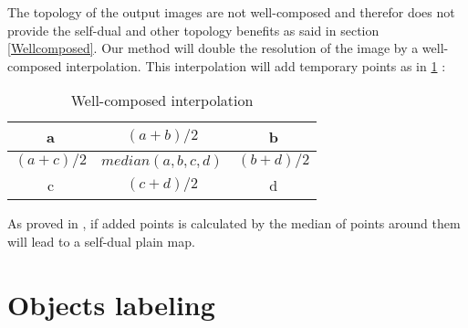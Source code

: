 \par The topology of the output images are not well-composed and therefor does not provide the self-dual and other topology benefits as said in section \ref{Wellcomposed}. Our method will double the resolution of the image by a well-composed interpolation. This interpolation will add temporary points as in \ref{WllCmpInterpolation} :
\par
\begin{table}
	\centering
	\begin{tabular}{|c|c|c|}
	\hline 
	a & ${(a+b)}/{2}$ & b \\ 
	\hline 
	${(a+c)}/{2}$ & $median(a,b,c,d)$ & ${(b+d)}/{2}$ \\ 
	\hline 
	c & ${(c+d)}/{2}$ & d \\ 
	\hline 

	\end{tabular}
	\caption{Well-composed interpolation} \label{WllCmpInterpolation}
\end{table}

\par
As proved in \cite{geraud.15.ismm}, if added points is calculated by the median of points around them will lead to a self-dual plain map.


\section{Objects labeling}

